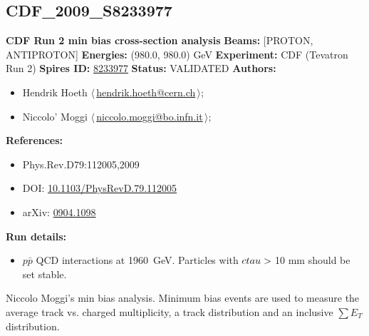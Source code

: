 \subsection[CDF\_2009\_S8233977]{CDF\_2009\_S8233977\,\cite{Aaltonen:2009ne}}
\textbf{CDF Run 2 min bias cross-section analysis}\newline
\textbf{Beams:} [PROTON, ANTIPROTON] \newline
\textbf{Energies:} (980.0, 980.0) GeV \newline
\textbf{Experiment:} CDF (Tevatron Run 2) \newline
\textbf{Spires ID:} \href{http://www.slac.stanford.edu/spires/find/hep/www?rawcmd=key+8233977}{8233977}\newline
\textbf{Status:} VALIDATED\newline
\textbf{Authors:}
\begin{itemize}
  \item Hendrik Hoeth $\langle\,$\href{mailto:hendrik.hoeth@cern.ch}{hendrik.hoeth@cern.ch}$\,\rangle$;
  \item Niccolo' Moggi $\langle\,$\href{mailto:niccolo.moggi@bo.infn.it}{niccolo.moggi@bo.infn.it}$\,\rangle$;
\end{itemize}
\textbf{References:}
\begin{itemize}
  \item Phys.Rev.D79:112005,2009
  \item DOI: \href{http://dx.doi.org/10.1103/PhysRevD.79.112005}{10.1103/PhysRevD.79.112005}
  \item arXiv: \href{http://arxiv.org/abs/0904.1098}{0904.1098}
\end{itemize}
\textbf{Run details:}
\begin{itemize}

  \item $p\bar{p}$ QCD interactions at 1960~GeV. Particles with $c \\tau > {}$10 mm should be set stable.\end{itemize}

\noindent Niccolo Moggi's min bias analysis. Minimum bias events are used to measure the average track \pT vs. charged multiplicity, a track \pT distribution and an inclusive $\sum E_T$ distribution.

\clearpage


\clearpage

